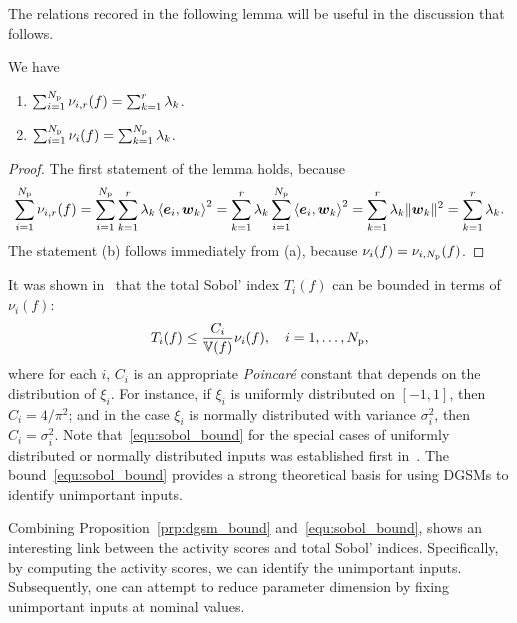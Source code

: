 The relations recored in the following lemma will be useful in the discussion 
that follows.
\begin{lemma}\label{lem:sum}
We have
\begin{enumerate}[label=(\alph*)]
\item $\sum_{i = 1}^\Np \act{f}{i}{r} = \sum_{k = 1}^r \lambda_k$. 
\item $\sum_{i = 1}^\Np \nu_i(f) = \sum_{k = 1}^\Np \lambda_k$. 
\end{enumerate}
\end{lemma}
\begin{proof}
The first statement of the lemma holds, because
\[
\sum_{i=1}^\Np \act{f}{i}{r}    
= \sum_{i=1}^\Np \sum_{k=1}^r \lambda_k \ip{\vec{e}_i}{\vec{w}_k}^2 
= \sum_{k=1}^r \lambda_k \sum_{i=1}^\Np \ip{\vec{e}_i}{\vec{w}_k}^2 
= \sum_{k=1}^r \lambda_k \| \vec{w}_k \|^2 = \sum_{k=1}^r \lambda_k.
\]
The statement (b) follows immediately from (a), because $\nu_i(f) = \act{f}{i}{\Np}$.
\end{proof}

It was shown in~\cite{Lamboni:2013} that the total Sobol' 
index $T_i(f)$ can be bounded in terms of $\nu_i(f)$:
\begin{equation}\label{equ:sobol_bound}
T_i(f) \leq \frac{C_i}{\V(f)}\nu_i(f), \quad i = 1, \ldots, \Np,
\end{equation}
where for each $i$, $C_i$ is an appropriate \emph{Poincar\'{e}} constant
that depends on the distribution of $\xi_i$.
For instance, if $\xi_i$ is uniformly distributed on $[-1, 1]$, then $C_i = 4/\pi^2$; and in the 
case $\xi_i$ is normally distributed with variance $\sigma_i^2$, then $C_i = \sigma_i^2$. 
Note that~\eqref{equ:sobol_bound} for the special cases of 
uniformly distributed or normally distributed inputs was established first in~\cite{Sobol:2009}.
The bound~\eqref{equ:sobol_bound} provides a strong theoretical basis for using DGSMs to identify 
unimportant inputs. 

Combining Proposition~\ref{prp:dgsm_bound} and~\eqref{equ:sobol_bound}, shows
an interesting link between the activity scores and total Sobol' indices.
Specifically, by computing the activity scores, we can identify the unimportant
inputs.  
Subsequently, 
one can attempt to reduce parameter dimension by fixing
unimportant inputs at nominal values. 


